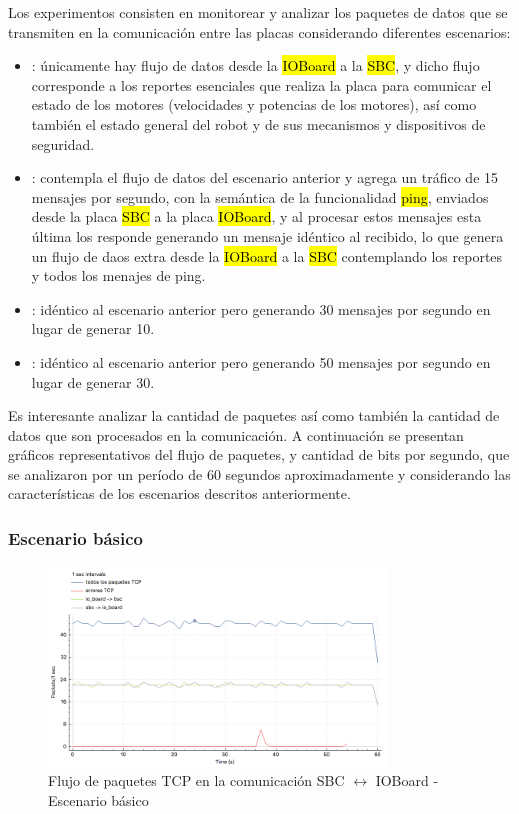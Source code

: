 \documentclass[withindex,glossary]{cam-thesis}
\begin{document}
Los experimentos consisten en monitorear y analizar los paquetes  de datos que se transmiten en la comunicación entre las placas considerando diferentes escenarios:
\begin{itemize}
	\item {}: únicamente hay flujo de datos desde la \hl{IOBoard} a la \hl{SBC}, y dicho flujo corresponde a los reportes esenciales que realiza la placa para comunicar el estado de los motores (velocidades y potencias de los motores), así como también el estado general del robot y de sus mecanismos y dispositivos de seguridad.
	\item {}: contempla el flujo de datos del escenario anterior y agrega un tráfico de 15 mensajes por segundo, con la semántica de la funcionalidad \hl{ping}, enviados desde la placa \hl{SBC} a la placa \hl{IOBoard}, y al procesar estos mensajes esta última los responde generando un mensaje idéntico al recibido, lo que genera un flujo de daos extra desde la \hl{IOBoard} a la \hl{SBC} contemplando los reportes y todos los menajes de ping.
	\item {}: idéntico al escenario anterior pero generando 30 mensajes por segundo en lugar de generar 10.
	\item {}: idéntico al escenario anterior pero generando 50 mensajes por segundo en lugar de generar 30.
\end{itemize}
Es interesante analizar la cantidad de paquetes así como también la cantidad de datos que son procesados en la comunicación. A continuación se presentan gráficos representativos del flujo de paquetes, y cantidad de bits por segundo, que se analizaron por un período de 60 segundos aproximadamente y considerando las características de los escenarios descritos anteriormente.

\subsubsection{Escenario básico}
\begin{figure}[H]
  \centering
  	\includegraphics[width=0.8\textwidth]{images/TCP_Throughput_io_to_pc_basic_pkps}
  	\caption[Throughput de la conexión TCP - Básico]{Flujo de paquetes TCP en la comunicación SBC $\leftrightarrow$ IOBoard -  Escenario básico}
  \label{fig:TCP_Throughput_io_to_pc_basic_pkps}
\end{figure}
\end{document}
